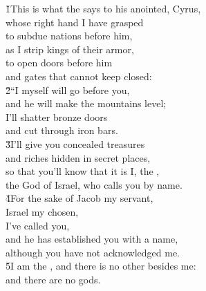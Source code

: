 \begin{poetry}
\poeml {}
\v{1}This is what the  says to his anointed, Cyrus, \\
\poemll    whose right hand I have grasped \\
\poeml to subdue nations before him, \\
\poemll    as I strip kings of their armor, \\
\poeml to open doors before him \\
\poemll    and gates that cannot keep closed: \\
\poeml \v{2}``I myself will go before you, \\
\poemll    and he will make the mountains level; \\
\poeml I'll shatter bronze doors \\
\poemll    and cut through iron bars. \\
\poeml \v{3}I'll give you concealed treasures \\
\poemll    and riches hidden in secret places, \\
\poeml so that you'll know that it is I, the , \\
\poemll    the God of Israel, who calls you by name. \\
\poeml \v{4}For the sake of Jacob my servant, \\
\poemll    Israel my chosen, \\
\poeml I've called you, \\
\poemll    and he has established you with a name, \\
\poemlll       although you have not acknowledged me. \\
\poeml \v{5}I am the , and there is no other besides me: \\
\poemll    and there are no gods. \\

\end{poetry}
